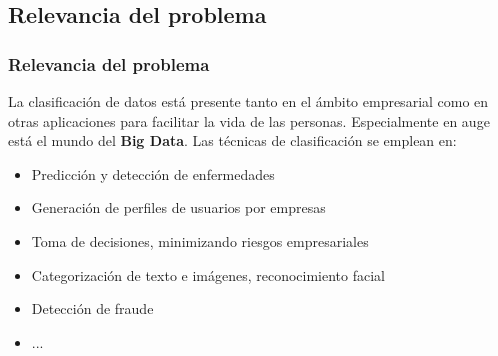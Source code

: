 \documentclass[8pt]{beamer}
\begin{document}
\subsection{Relevancia del problema}
  \begin{frame}
    \frametitle{Relevancia del problema}
    
    La clasificación de datos está presente tanto en el ámbito empresarial como
    en otras aplicaciones para facilitar la vida de las personas. Especialmente
    en auge está el mundo del \textbf{Big Data}. Las técnicas de clasificación 
    se emplean en:
    
    
    \begin{itemize}
  	 \item Predicción y detección de enfermedades
  	 \item Generación de perfiles de usuarios por empresas
  	 \item Toma de decisiones, minimizando riesgos empresariales
  	 \item Categorización de texto e imágenes, reconocimiento facial
  	 \item Detección de fraude
     \item ...
    \end{itemize}
    
  \end{frame}
  
\end{document}
